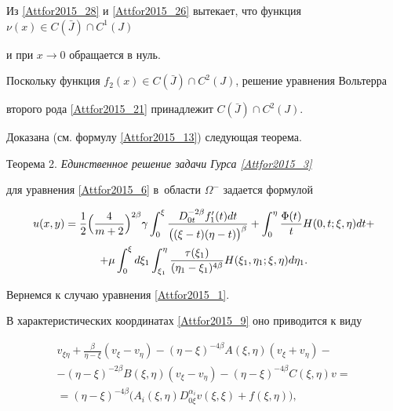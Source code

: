 Из \eqref{Attfor2015_28} и \eqref{Attfor2015_26} вытекает, что функция $\nu(x)\in C(\bar{J})\cap C^1(J)$

и при $x\rightarrow 0$ обращается в нуль.



Поскольку функция $f_2(x)\in C(\bar{J})\cap C^2(J)$, решение уравнения Вольтерра

второго рода \eqref{Attfor2015_21} принадлежит $C(\bar{J})\cap C^2(J)$.



Доказана (см. формулу \eqref{Attfor2015_13}) следующая теорема.



\smallskip



{\small \sc Теорема 2.} \it  Единственное решение задачи Гурса \eqref{Attfor2015_3}

для уравнения \eqref{Attfor2015_6} в~области $\Omega^-$ задается формулой

\begin{multline}

u(x,y)=\frac{1}{2} \Bigl(\frac{4}{m+2} \Bigr)^{2\beta} \gamma  \int _0^\xi

\frac{D_{0t}^{-2\beta}f_1'(t)dt}{\bigl((\xi-t)(\eta-t)\bigr)^\beta}+

 \int _0^\eta \frac{\Phi(t)}{t}H(0,t;\xi,\eta)dt+

\\

+\mu \int _0^\xi d\xi_1  \int _{\xi_1}^\eta

\frac{\tau(\xi_1)}{(\eta_1-\xi_1)^{4\beta}}

H(\xi_1,\eta_1;\xi,\eta)d\eta_1.

\end{multline}





\rm



\smallskip



Вернемся к случаю уравнения \eqref{Attfor2015_1}. 

В характеристических координатах \eqref{Attfor2015_9} оно приводится к виду

\begin{multline}

\label{Attfor2015_29}

v_{\xi\eta}+\frac{\beta}{\eta-\xi}(v_\xi-v_\eta)-(\eta-\xi)^{-4\beta}A(\xi,\eta)(v_\xi+v_\eta)-

\\

-(\eta-\xi)^{-2\beta}B(\xi,\eta)(v_\xi-v_\eta)-(\eta-\xi)^{-4\beta}C(\xi,\eta)v=

\\

=(\eta-\xi)^{-4\beta}\bigl(A_i(\xi,\eta)D_{0\xi}^{\alpha_i}v(\xi,\xi)+f(\xi,\eta)\bigr),

\end{multline}

